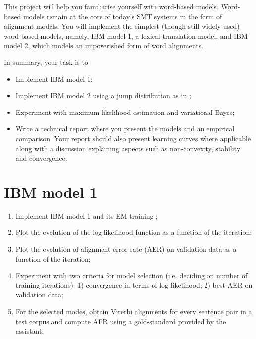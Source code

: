 
This project will help you familiarise yourself with word-based
models.  Word-based models remain at the core of today's SMT systems
in the form of alignment models.
You will implement the simplest (though still widely used) word-based
models, namely, IBM model 1, a lexical translation model, and IBM model 2, which models an impoverished form of word alignments.

In summary, your task is to

\begin{itemize}
	\item Implement IBM model 1;
	\item Implement IBM model 2 using a jump distribution as in \cite{Vogel+1996:HMMWA};
	\item Experiment with maximum likelihood estimation and variational Bayes;
	\item Write a technical report where you present the models and an empirical comparison. Your report should also present learning curves
    where applicable along with a discussion explaining aspects such
    as non-convexity, stability and convergence.
\end{itemize}

\section{IBM model 1}

\begin{enumerate}
	\item Implement IBM model 1 and its EM training \citep{Brown+1993:smt};
	\item Plot the evolution of the log likelihood function as a function of the iteration;
	\item Plot the evolution of alignment error rate (AER) on validation data as a function of the iteration;
	\item Experiment with two criteria for model selection (i.e. deciding on number of training iterations): 1) convergence in terms of log likelihood; 2) best AER on validation data;
	\item For the selected modes, obtain Viterbi alignments for every sentence pair in a test corpus and compute AER using a gold-standard provided by the assistant;
\end{enumerate}


